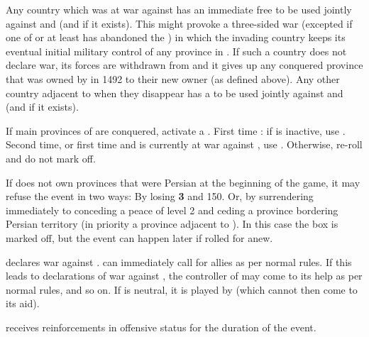 \phdipl
\aparag Any country which was at war against  has an
immediate free \CB to be used jointly against \POLpol and \SUEsue (and
\payscourlande if it exists).  This might provoke a three-sided war (excepted
if one of \POL or \SUE at least has abandoned the )
in which the invading country keeps its eventual initial military control of
any province in .
\aparag If such a country does not declare war, its forces are withdrawn from
 and it gives up any conquered province that was owned by
 in 1492 to their new owner (as defined above).
\aparag Any other country adjacent to  when they disappear
has a \CB to be used jointly against \POLpol and \SUEsue (and \payscourlande
if it exists).





\condition{}
\aparag If main provinces of \paysperse are conquered, activate a
.
\aparag First time : if \paysperse is inactive, use .
\aparag Second time, or first time and \paysperse is currently at war against
\TUR, use .
\aparag Otherwise, re-roll and do not mark off.



\activation{}
\aparag If \TUR does not own provinces that were Persian at the beginning of
the game, it may refuse the event in two ways:
\bparag By losing {\bf 3} \STAB and 150\ducats.
\bparag Or, by surrendering immediately to \paysPerse conceding a peace of
level 2 and ceding a province bordering Persian territory (in priority a
province adjacent to \paysPerse).
\aparag In this case the box is marked off, but the event can happen later if
rolled for anew.

\phevnt
\aparag \paysPerse declares war against \TUR.
\aparag \TUR can immediately call for allies as per normal rules.
\aparag If this leads to declarations of war against \paysperse, the
controller of \paysperse may come to its help as per normal rules, and so on.
\aparag If \paysperse is neutral, it is played by \SPA (which cannot then come
to its aid).

\phadm
\aparag \paysperse receives reinforcements in offensive status for the
duration of the event.


